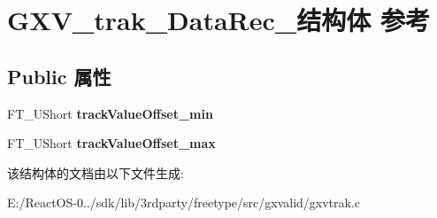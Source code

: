 \hypertarget{struct_g_x_v__trak___data_rec__}{}\section{G\+X\+V\+\_\+trak\+\_\+\+Data\+Rec\+\_\+结构体 参考}
\label{struct_g_x_v__trak___data_rec__}
\subsection*{Public 属性}
\begin{DoxyCompactItemize}
\item 
\mbox{\label{struct_g_x_v__trak___data_rec___a58f30cf85f19355bebf87bb7a49147e7}} 
F\+T\+\_\+\+U\+Short {\bfseries track\+Value\+Offset\+\_\+min}
\item 
\mbox{\label{struct_g_x_v__trak___data_rec___aa6e4b0a2d55703e6dc2a916a3d36f04e}} 
F\+T\+\_\+\+U\+Short {\bfseries track\+Value\+Offset\+\_\+max}
\end{DoxyCompactItemize}


该结构体的文档由以下文件生成\+:\begin{DoxyCompactItemize}
\item 
E\+:/\+React\+O\+S-\/0../sdk/lib/3rdparty/freetype/src/gxvalid/gxvtrak.\+c\end{DoxyCompactItemize}
